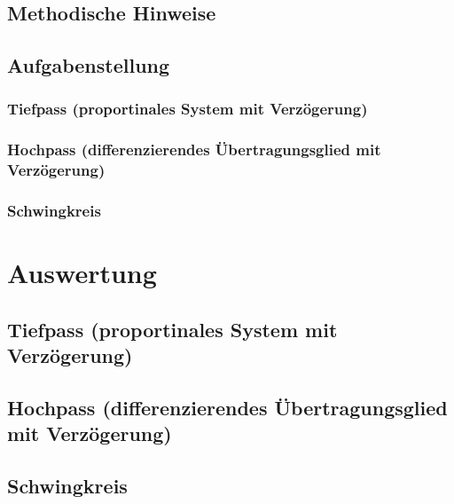 \subsection{Methodische Hinweise}
\subsection{Aufgabenstellung}
\subsubsection{Tiefpass (proportinales System mit Verzögerung)}
\subsubsection{Hochpass (differenzierendes Übertragungsglied mit Verzögerung)}
\subsubsection{Schwingkreis}
\section{Auswertung}
\subsection{Tiefpass (proportinales System mit Verzögerung)}
\subsection{Hochpass (differenzierendes Übertragungsglied mit Verzögerung)}
\subsection{Schwingkreis}

